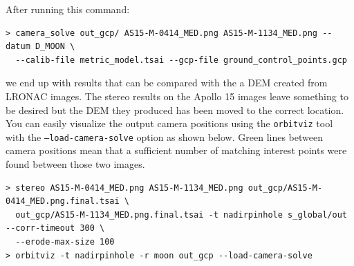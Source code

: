After running this command:
\begin{verbatim}
> camera_solve out_gcp/ AS15-M-0414_MED.png AS15-M-1134_MED.png --datum D_MOON \
  --calib-file metric_model.tsai --gcp-file ground_control_points.gcp
\end{verbatim}
we end up with results that can be compared with the a DEM created from LRONAC images.
The stereo results on the Apollo 15 images leave something to be desired but the
DEM they produced has been moved to the correct location.  You can easily visualize
the output camera positions using the \texttt{orbitviz} tool with the
\texttt{--load-camera-solve} option as shown below.  Green lines between camera
positions mean that a sufficient number of matching interest points were found
between those two images.

\begin{verbatim}
> stereo AS15-M-0414_MED.png AS15-M-1134_MED.png out_gcp/AS15-M-0414_MED.png.final.tsai \
  out_gcp/AS15-M-1134_MED.png.final.tsai -t nadirpinhole s_global/out  --corr-timeout 300 \
  --erode-max-size 100
> orbitviz -t nadirpinhole -r moon out_gcp --load-camera-solve
\end{verbatim}


